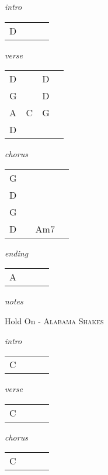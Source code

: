 \documentclass[12pt]{article}
\begin{document}
\huge
\textit{intro}

\begin{tabular}{|P{1.25in}|P{1.25in}|P{1.25in}|P{1.25in}|}
  D  &   &   &   \\
\end{tabular}

\textit{verse}

\begin{tabular}{|P{1.25in}|P{1.25in}|P{1.25in}|P{1.25in}|}
  D &   &  D &   \\
  G &   &  D &   \\
  A & C  &  G &  \\
  D &   &    &   \\
\end{tabular}

\textit{chorus}

\begin{tabular}{|P{1.25in}|P{1.25in}|P{1.25in}|P{1.25in}|}
  G &   &   &   \\
  D &   &   &   \\
  G &   &   &   \\
  D &   & Am7  &   \\
\end{tabular}

\textit{ending}

\begin{tabular}{|P{1.25in}|P{1.25in}|P{1.25in}|P{1.25in}|}
  A &   &   &   \\
\end{tabular}

\textit{notes}

\newpage

{\Huge Hold On} {\huge - \textsc{Alabama Shakes}}

\huge
\textit{intro}

\begin{tabular}{|P{1.25in}|P{1.25in}|P{1.25in}|P{1.25in}|}
  C &   &   &   \\
\end{tabular}

\textit{verse}

\begin{tabular}{|P{1.25in}|P{1.25in}|P{1.25in}|P{1.25in}|}
  C &   &   &   \\
\end{tabular}

\textit{chorus}

\begin{tabular}{|P{1.25in}|P{1.25in}|P{1.25in}|P{1.25in}|}
  C &   &   &   \\
\end{tabular}
\end{document}

